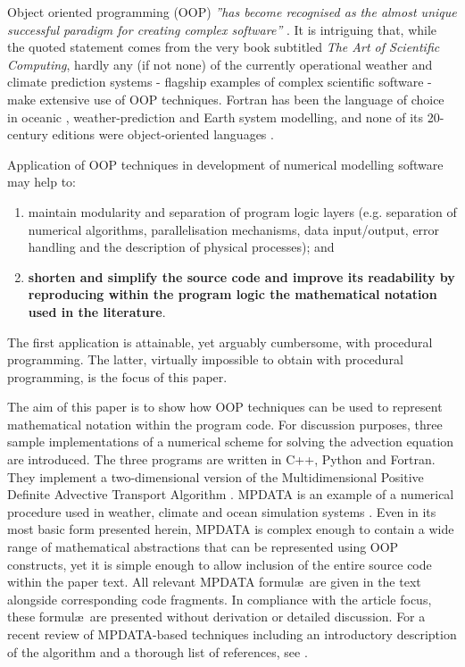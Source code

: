 \documentclass[gmd]{copernicus}%
\begin{document}
  \introduction

  Object oriented programming (OOP) {\em ''has become recognised as the almost unique successful 
    paradigm for creating complex software''} \citep[][Sec.~1.3]{Press_et_al_2007}.
  It is intriguing that, while the quoted statement comes from the very book subtitled 
   {\em The Art of Scientific Computing}, hardly any (if not none) of the currently operational 
    weather and climate prediction systems - flagship examples of complex scientific software - 
    make extensive use of OOP techniques.
  Fortran has been the language of choice in oceanic \citep{Griffies_et_al_2000}, 
    weather-prediction \citep{Sundberg_2009} and Earth system \citep{Legutke_2012} modelling, 
    and none of its 20-century editions were object-oriented languages \citep[see e.g.][for discussion]{Norton_et_al_2007}.

  Application of OOP techniques in development of numerical modelling software may help to:
  \begin{enumerate}[label=(\roman*), leftmargin=*, widest=ii]
    \item{maintain modularity and separation of program logic layers (e.g. separation of
      numerical algorithms, parallelisation mechanisms, data input/output, error handling and
      the description of physical processes); and}
    \item{{\bf shorten and simplify the source code and improve its readability by reproducing within 
      the program logic the mathematical notation used in the literature}.}
  \end{enumerate}
  The first application is attainable, yet arguably cumbersome, with procedural programming.
  The latter, virtually impossible to obtain with procedural programming, is the focus of this paper.
  
  The aim of this paper is to show how OOP techniques can be used to represent mathematical
    notation within the program code.
  For discussion purposes, three sample implementations of a numerical scheme for solving
    the advection equation are introduced.
  The three programs are written in C++, Python and Fortran. 
  They implement a two-dimensional version of the 
    Multidimensional Positive Definite Advective Transport Algorithm \citep[MPDATA][]{Smolarkiewicz_1984}.
  MPDATA is an example of a numerical procedure used in weather, climate and ocean simulation systems
    \citep[e.g.][respectively]{Ziemianski_et_al_2011,Abiodun_et_al_2011,Ezer_et_al_2002}.
  Even in its most basic form presented herein, MPDATA is complex enough to contain
    a wide range of mathematical abstractions that can be represented using OOP constructs, 
    yet it is simple enough to allow inclusion of the entire source code within the paper text.
  All relevant MPDATA formul\ae~are given in the text alongside corresponding code fragments.
  In compliance with the article focus, these formul\ae~are presented without derivation or detailed discussion.
  For a recent review of MPDATA-based techniques including an introductory description of the algorithm
    and a thorough list of references, see \citet[][]{Smolarkiewicz_2006}.
\end{document}

